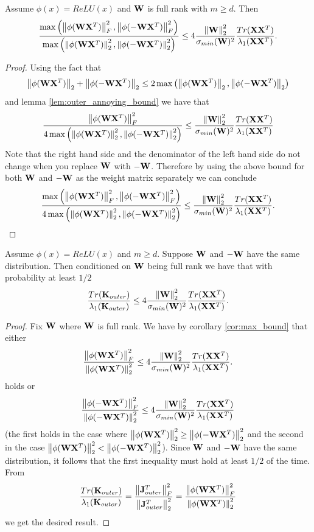 \begin{corollary}\label{cor:max_bound}
Assume $\phi(x) = ReLU(x)$ and $\mathbf{W}$ is full rank with $m \geq d$.  Then
\[\frac{\max\left(\left\lVert\phi(\mathbf{W} \mathbf{X}^T)\right\rVert_F^2, \left\lVert\phi(-\mathbf{W} \mathbf{X}^T)\right\rVert_F^2\right)}{\max\left(\left\lVert\phi(\mathbf{W} \mathbf{X}^T)\right\rVert_2^2, \left\lVert\phi(-\mathbf{W} \mathbf{X}^T)\right\rVert_2^2\right)} \leq 4 \frac{\left\lVert\mathbf{W}\right\rVert_2^2}{\sigma_{min}(\mathbf{W})^2} \frac{Tr(\mathbf{X} \mathbf{X}^T)}{\lambda_1(\mathbf{X} \mathbf{X}^T)}. \]
\end{corollary}
\begin{proof}
Using the fact that
\[\left\lVert\phi(\mathbf{W} \mathbf{X}^T)\right\rVert_2 + \left\lVert\phi(-\mathbf{W} \mathbf{X}^T)\right\rVert_2 \leq 2 \max\left(\left\lVert\phi(\mathbf{W} \mathbf{X}^T)\right\rVert_2, \left\lVert\phi(-\mathbf{W} \mathbf{X}^T)\right\rVert_2\right) \]
and lemma \ref{lem:outer_annoying_bound} we have that
\[\frac{\left\lVert\phi(\mathbf{W} \mathbf{X}^T)\right\rVert_F^2}{4 \max\left(\left\lVert\phi(\mathbf{W} \mathbf{X}^T)\right\rVert_2^2, \left\lVert\phi(-\mathbf{W} \mathbf{X}^T)\right\rVert_2^2\right)} \leq \frac{\left\lVert\mathbf{W}\right\rVert_2^2}{\sigma_{min}(\mathbf{W})^2} \frac{Tr(\mathbf{X} \mathbf{X}^T)}{\lambda_1(\mathbf{X} \mathbf{X}^T)}\]
Note that the right hand side and the denominator of the left hand side do not change when you replace $\mathbf{W}$ with $-\mathbf{W}$.  Therefore by using the above bound for both $\mathbf{W}$ and $-\mathbf{W}$ as the weight matrix separately we can conclude
\[\frac{\max\left(\left\lVert\phi(\mathbf{W} \mathbf{X}^T)\right\rVert_F^2, \left\lVert\phi(-\mathbf{W} \mathbf{X}^T)\right\rVert_F^2\right)}{4 \max\left(\left\lVert\phi(\mathbf{W} \mathbf{X}^T)\right\rVert_2^2, \left\lVert\phi(-\mathbf{W} \mathbf{X}^T)\right\rVert_2^2\right)} \leq \frac{\left\lVert\mathbf{W}\right\rVert_2^2}{\sigma_{min}(\mathbf{W})^2} \frac{Tr(\mathbf{X} \mathbf{X}^T)}{\lambda_1(\mathbf{X} \mathbf{X}^T)}. \]
\end{proof}


\begin{corollary}\label{cor:half_prob_bound}
Assume $\phi(x) = ReLU(x)$ and $m \geq d$.  Suppose $\mathbf{W}$ and $-\mathbf{W}$ have the same distribution.  Then conditioned on $\mathbf{W}$ being full rank we have that with probability at least $1/2$
\[ \frac{Tr(\mathbf{K}_{outer})}{\lambda_1(\mathbf{K}_{outer})} \leq 4 \frac{\left\lVert\mathbf{W}\right\rVert_2^2}{\sigma_{min}(\mathbf{W})^2} \frac{Tr(\mathbf{X} \mathbf{X}^T)}{\lambda_1(\mathbf{X} \mathbf{X}^T)}. \]
\end{corollary}
\begin{proof}
Fix $\mathbf{W}$ where $\mathbf{W}$ is full rank.  We have by corollary \ref{cor:max_bound} that either
\[\frac{\left\lVert\phi(\mathbf{W} \mathbf{X}^T)\right\rVert_F^2}{\left\lVert\phi(\mathbf{W} \mathbf{X}^T)\right\rVert_2^2} \leq 4 \frac{\left\lVert\mathbf{W}\right\rVert_2^2}{ \sigma_{min}(\mathbf{W})^2} \frac{Tr(\mathbf{X} \mathbf{X}^T)}{\lambda_1(\mathbf{X} \mathbf{X}^T)}. \]
holds or
\[\frac{\left\lVert\phi(-\mathbf{W} \mathbf{X}^T)\right\rVert_F^2}{\left\lVert\phi(-\mathbf{W} \mathbf{X}^T)\right\rVert_2^2} \leq 4 \frac{\left\lVert\mathbf{W}\right\rVert_2^2}{\sigma_{min}(\mathbf{W})^2} \frac{Tr(\mathbf{X} \mathbf{X}^T)}{\lambda_1(\mathbf{X} \mathbf{X}^T)} \]
(the first holds in the case where $\left\lVert\phi(\mathbf{W} \mathbf{X}^T)\right\rVert_2^2 \geq \left\lVert\phi(-\mathbf{W} \mathbf{X}^T)\right\rVert_2^2$ and the second in the case $\left\lVert\phi(\mathbf{W} \mathbf{X}^T)\right\rVert_2^2 < \left\lVert\phi(-\mathbf{W} \mathbf{X}^T)\right\rVert_2^2$).  Since $\mathbf{W}$ and $-\mathbf{W}$ have the same distribution, it follows that the first inequality must hold at least $1/2$ of the time.  From
\[ \frac{Tr(\mathbf{K}_{outer})}{\lambda_1(\mathbf{K}_{outer})} = \frac{\left\lVert\mathbf{J}_{outer}^T\right\rVert_F^2}{\left\lVert\mathbf{J}_{outer}^T\right\rVert_2^2} = \frac{\left\lVert\phi(\mathbf{W} \mathbf{X}^T)\right\rVert_F^2}{\left\lVert\phi(\mathbf{W} \mathbf{X}^T)\right\rVert_2^2} \]
we get the desired result.
\end{proof}


